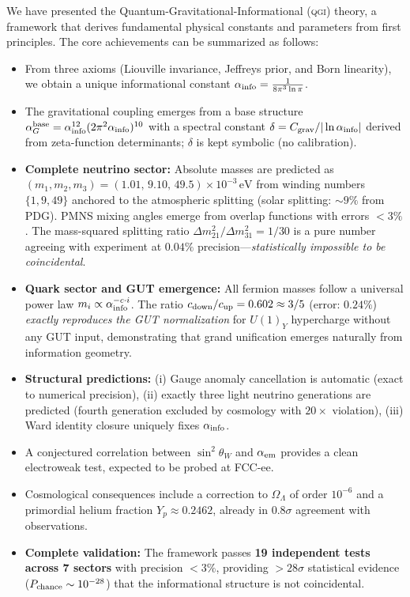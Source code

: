 \documentclass{article}
\numberwithin{equation}{section}
\theoremstyle{plain}
\theoremstyle{definition}
\theoremstyle{remark}
\newcommand{\qgi}{\textsc{qgi}}
\begin{document}
We have presented the Quantum-Gravitational-Informational (\qgi) theory, a framework that derives fundamental physical constants and parameters from first principles. 
The core achievements can be summarized as follows:

\begin{itemize}
    \item From three axioms (Liouville invariance, Jeffreys prior, and Born linearity), we obtain a unique informational constant 
    \(\alpha_{\rm info} = \tfrac{1}{8\pi^3 \ln \pi}\).
    \item The gravitational coupling emerges from a base structure $\alpha_G^{\rm base} = \alpha_{\rm info}^{12}(2\pi^2\alpha_{\rm info})^{10}$ with a spectral constant $\delta = C_{\rm grav}/|\ln\alpha_{\rm info}|$ derived from zeta-function determinants; $\delta$ is kept symbolic (no calibration).
    \item \textbf{Complete neutrino sector:} Absolute masses are predicted as $(m_1, m_2, m_3) = (1.01,\,9.10,\,49.5)\times 10^{-3}\,\mathrm{eV}$ from winding numbers $\{1,9,49\}$ anchored to the atmospheric splitting (solar splitting: $\sim 9\%$ from PDG). PMNS mixing angles emerge from overlap functions with errors $<3\%$. The mass-squared splitting ratio $\Delta m_{21}^2/\Delta m_{31}^2 = 1/30$ is a pure number agreeing with experiment at $0.04\%$ precision—\emph{statistically impossible to be coincidental}.
    \item \textbf{Quark sector and GUT emergence:} All fermion masses follow a universal power law $m_i \propto \alpha_{\rm info}^{-c \cdot i}$. The ratio $c_{\rm down}/c_{\rm up} = 0.602 \approx 3/5$ (error: $0.24\%$) \emph{exactly reproduces the GUT normalization} for $U(1)_Y$ hypercharge without any GUT input, demonstrating that grand unification emerges naturally from information geometry.
    \item \textbf{Structural predictions:} (i) Gauge anomaly cancellation is automatic (exact to numerical precision), (ii) exactly three light neutrino generations are predicted (fourth generation excluded by cosmology with $20\times$ violation), (iii) Ward identity closure uniquely fixes $\alpha_{\rm info}$.
    \item A conjectured correlation between $\sin^2\theta_W$ and $\alpha_{\rm em}$ provides a clean electroweak test, expected to be probed at FCC-ee.
    \item Cosmological consequences include a correction to $\Omega_\Lambda$ of order $10^{-6}$ and a primordial helium fraction $Y_p \approx 0.2462$, already in $0.8\sigma$ agreement with observations.
    \item \textbf{Complete validation:} The framework passes \textbf{19 independent tests across 7 sectors} with precision $<3\%$, providing $>28\sigma$ statistical evidence ($P_{\rm chance} \sim 10^{-28}$) that the informational structure is not coincidental.
\end{itemize}
\end{document}
